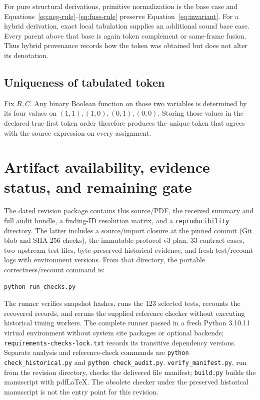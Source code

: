 \documentclass[10pt]{article}
\theoremstyle{plain}
\theoremstyle{definition}
\theoremstyle{remark}
\begin{document}
For pure structural derivations, primitive normalization is the base case and Equations~\eqref{eq:neg-rule}--\eqref{eq:fuse-rule} preserve Equation~\eqref{eq:invariant}. For a hybrid derivation, exact local tabulation supplies an additional sound base case. Every parent above that base is again token complement or same-frame fusion. Thus hybrid provenance records how the token was obtained but does not alter its denotation.

\subsection{Uniqueness of tabulated token}

Fix $R,C$. Any binary Boolean function on those two variables is determined by its four values on $(1,1),(1,0),(0,1),(0,0)$. Storing those values in the declared true-first token order therefore produces the unique token that agrees with the source expression on every assignment.

\section{Artifact availability, evidence status, and remaining gate}
\label{sec:availability}

The dated revision package contains this source/PDF, the received summary and full audit bundle, a finding-ID resolution matrix, and a \texttt{reproducibility} directory. The latter includes a source/import closure at the pinned commit (Git blob and SHA-256 checks), the immutable protocol-v3 plan, 33 contract cases, two upstream test files, byte-preserved historical evidence, and fresh test/recount logs with environment versions. From that directory, the portable correctness/recount command is:
\begin{lstlisting}
python run_checks.py
\end{lstlisting}
The runner verifies snapshot hashes, runs the 123 selected tests, recounts the recovered records, and reruns the supplied reference checker without executing historical timing workers. The complete runner passed in a fresh Python 3.10.11 virtual environment without system site packages or optional backends; \texttt{requirements-checks-lock.txt} records its transitive dependency versions. Separate analysis and reference-check commands are \texttt{python check\_historical.py} and \texttt{python check\_audit.py}. \texttt{verify\_manifest.py}, run from the revision directory, checks the delivered file manifest; \texttt{build.py} builds the manuscript with pdfLaTeX. The obsolete checker under the preserved historical manuscript is not the entry point for this revision.
\end{document}
